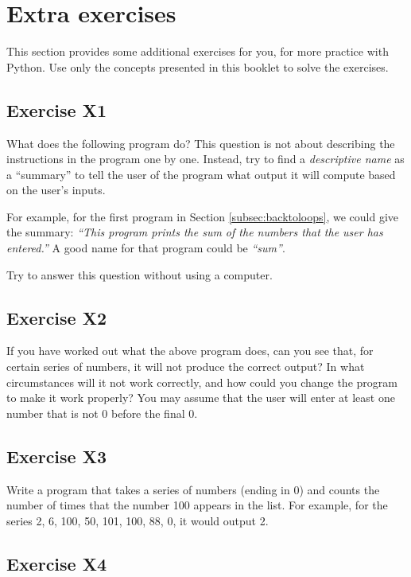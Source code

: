 \section{Extra exercises}
\label{sec:additional-exercises}

This section provides some additional exercises for you, for more
practice with Python.  Use only the concepts presented in this
booklet to solve the exercises.

\subsection*{Exercise X1}

What does %
the following
program do? This question is not about describing
the instructions in the program one by one. Instead, try to find a
\emph{descriptive name} as a ``summary'' to tell the user of the
program what output it will compute based on the user's inputs.

For example, for the first program in
Section \ref{subsec:backtoloops}, we could give the summary:
\emph{``This program prints
the sum of the numbers that the user has entered.''}
A good name for that program could be \emph{``sum''}.

Try to answer this question without using a computer.


\subsection*{Exercise X2}

If you have worked out what the above program does, can you
see that, for certain series of numbers, it will not produce the correct
output?  In what circumstances will it not work correctly, and how could
you change the program to make it work properly?
You may assume that the user will enter at least one number that is
not 0 before the final 0.

\subsection*{Exercise X3}

Write a program that takes a series of numbers (ending in 0) and counts
the number of times that the number 100 appears in the list.  For example,
for the series 2, 6, 100, 50, 101, 100, 88, 0, it would output 2.

\subsection*{Exercise X4}

